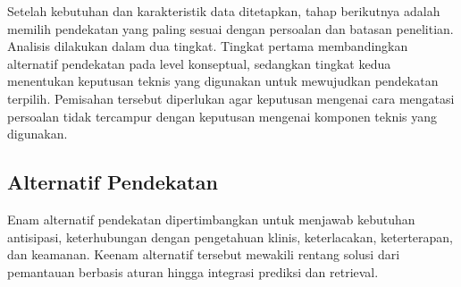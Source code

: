 Setelah kebutuhan dan karakteristik data ditetapkan, tahap berikutnya adalah memilih pendekatan yang paling sesuai dengan persoalan dan batasan penelitian. Analisis dilakukan dalam dua
tingkat. Tingkat pertama membandingkan alternatif pendekatan pada level konseptual, sedangkan tingkat kedua menentukan keputusan teknis yang digunakan untuk mewujudkan pendekatan 
terpilih. Pemisahan tersebut diperlukan agar keputusan mengenai cara mengatasi persoalan tidak tercampur dengan keputusan mengenai komponen teknis yang digunakan.

\subsection{Alternatif Pendekatan}
\label{subsec:bab3-alternatif-pendekatan}

Enam alternatif pendekatan dipertimbangkan untuk menjawab kebutuhan antisipasi, keterhubungan dengan pengetahuan klinis, keterlacakan, keterterapan, dan keamanan. Keenam alternatif
tersebut mewakili rentang solusi dari pemantauan berbasis aturan hingga integrasi prediksi dan retrieval.

